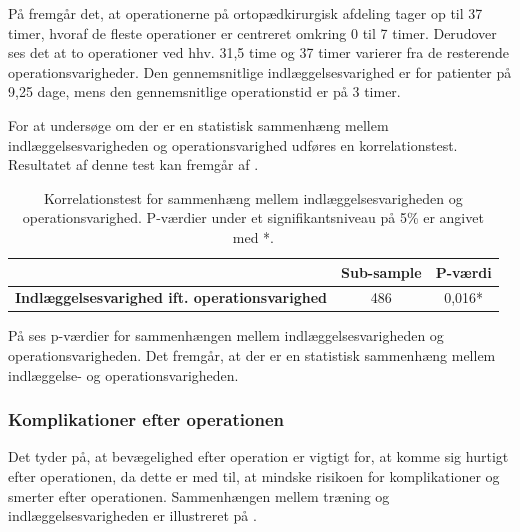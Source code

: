 \noindent
På  fremgår det, at operationerne på ortopædkirurgisk afdeling tager op til 37 timer, hvoraf de fleste operationer er centreret omkring 0 til 7 timer. Derudover ses det at to operationer ved hhv. 31,5 time og 37 timer varierer fra de resterende operationsvarigheder. Den gennemsnitlige indlæggelsesvarighed er for patienter på 9,25 dage, mens den gennemsnitlige operationstid er på 3 timer. 

For at undersøge om der er en statistisk sammenhæng mellem indlæggelsesvarigheden og operationsvarighed udføres en korrelationstest. Resultatet af denne test kan fremgår af .

\begin{table}[H]
\centering
\begin{tabular}{|c|c|c|}
\hline
\textbf{}                                             & \textbf{Sub-sample} & \textbf{P-værdi} \\ \hline
\textbf{Indlæggelsesvarighed ift. operationsvarighed} & 486                 & 0,016*           \\ \hline
\end{tabular}
\caption{Korrelationstest for sammenhæng mellem indlæggelsesvarigheden og operationsvarighed. P-værdier under et signifikantsniveau på 5\% er angivet med *.}
\label{opogindlaegtab}
\end{table}

\noindent
På  ses p-værdier for sammenhængen mellem indlæggelsesvarigheden og operationsvarigheden. Det fremgår, at der er en statistisk sammenhæng mellem indlæggelse- og operationsvarigheden. 

\subsubsection{Komplikationer efter operationen}
Det tyder på, at bevægelighed efter operation er vigtigt for, at komme sig hurtigt efter operationen, da dette er med til, at mindske risikoen for komplikationer og smerter efter operationen. Sammenhængen mellem træning og indlæggelsesvarigheden er illustreret på .

